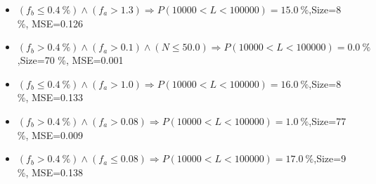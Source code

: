 \documentclass[numbered]{CSL}
\begin{document}
\begin{itemize}
\item $(f_b \leq 0.4~\%) \land (f_a > 1.3) \Rightarrow P(10 000 < L < 100 000) = 15.0~\%$,\hfill Size=8 \%, MSE=0.126
\item $(f_b > 0.4~\%) \land (f_a > 0.1) \land (N \leq 50.0) \Rightarrow P(10 000 < L < 100 000) = 0.0~\%$,\hfill Size=70 \%, MSE=0.001
\item $(f_b \leq 0.4~\%) \land (f_a > 1.0) \Rightarrow P(10 000 < L < 100 000) = 16.0~\%$,\hfill Size=8 \%, MSE=0.133
\item $(f_b > 0.4~\%) \land (f_a > 0.08) \Rightarrow P(10 000 < L < 100 000) = 1.0~\%$,\hfill Size=77 \%, MSE=0.009
\item $(f_b > 0.4~\%) \land (f_a \leq 0.08) \Rightarrow P(10 000 < L < 100 000) = 17.0~\%$,\hfill Size=9 \%, MSE=0.138
\end{itemize}
\end{document}
